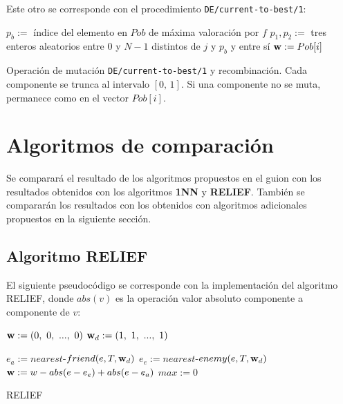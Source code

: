 \documentclass{article}
\newenvironment{algo}{
	\vspace*{0.5cm}
	\begin{algorithm}[H]}{
	\end{algorithm}
	\vspace*{0.5cm}
}
\begin{document}
Este otro se corresponde con el procedimiento \texttt{DE/current-to-best/1}:

\begin{algo}
	\BlankLine

	$p_b := $ índice del elemento en $Pob$ de máxima valoración por $f$\;
	$p_1, p_2 := $ tres enteros aleatorios entre $0$ y $N-1$ distintos de $j$ y $p_b$ y entre sí\;
	$\normalfont \textbf w := Pob[i]$\;
	\vspace{0.2cm}
	\caption{Operación de mutación \texttt{DE/current-to-best/1} y recombinación. Cada componente se trunca al intervalo $[0,\,1]$. Si una componente no se muta, permanece como en el vector $Pob[i]$.}
\end{algo}

\section{Algoritmos de comparación}

Se comparará el resultado de los algoritmos propuestos en el guion con los resultados obtenidos con los algoritmos \textbf{1NN} y \textbf{RELIEF}. También se compararán los resultados con los obtenidos con algoritmos adicionales propuestos en la siguiente sección.

\subsection{Algoritmo RELIEF}

El siguiente pseudocódigo se corresponde con la implementación del algoritmo RELIEF, donde $abs(v)$ es la operación valor absoluto componente a componente de $v$:

\begin{algo}

	$\normalfont \textbf w := (0,\ 0,\ ...,\ 0)$\;
	$\normalfont \textbf w_d := (1,\ 1,\ ...,\ 1)$\;

	 {
		$e_a := nearest$-$friend(e, T, \normalfont \textbf w_d)$\;
		$e_e := nearest$-$enemy(e, T, \normalfont \textbf w_d)$\;
		$\normalfont \textbf w := w - abs(e - e_e) + abs(e - e_a)$\;
	}
	$max := 0$\;
	 {
	}
	 {
	}
	\vspace{0.2cm}
	\caption{RELIEF}
\end{algo}
\end{document}

